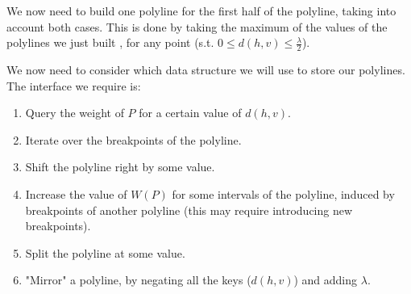 \documentclass[11pt,a4paper]{article}
\theoremstyle{definition}
\theoremstyle{remark}
\begin{document}
\begin{enumerate}
\end{enumerate}

We now need to build one polyline for the first half of the polyline, taking into account both cases. This is done by taking the maximum of the values of the polylines we just built , for any point (s.t. $0 \leq d(h,v) \leq \frac{\lambda}{2}$).

We now need to consider which data structure we will use to store our polylines. The interface we require is:
\begin{enumerate}
\item Query the weight of $P$ for a certain value of $d(h,v)$.
\item Iterate over the breakpoints of the polyline.
\item Shift the polyline right by some value.
\item Increase the value of $W(P)$ for some intervals of the polyline, induced by breakpoints of another polyline (this may require introducing new breakpoints). 
\item Split the polyline at some value.
\item "Mirror" a polyline, by negating all the keys ($d(h,v)$) and adding $\lambda$.
\end{enumerate}
\end{document}
